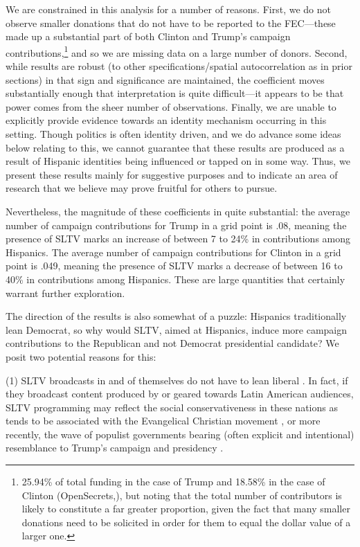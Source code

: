 \documentclass[11pt]{article}
\begin{document}
We are constrained in this analysis for a number of reasons. First, we do not observe smaller donations that do not have to be reported to the FEC---these made up a substantial part of both Clinton and Trump's campaign contributions,\footnote{ 25.94\% of total funding in the case of Trump and 18.58\% in the case of Clinton (OpenSecrets,\cite{noauthor_2016_2017}), but noting that the total number of contributors is likely to constitute a far greater proportion, given the fact that many smaller donations need to be solicited in order for them to equal the dollar value of a larger one.} and so we are missing data on a large number of donors. Second, while results are robust (to other specifications/spatial autocorrelation as in prior sections) in that sign and significance are maintained, the coefficient moves substantially enough that interpretation is quite difficult---it appears to be that power comes from the sheer number of observations. Finally, we are unable to explicitly provide evidence towards an identity mechanism occurring in this setting. Though politics is often identity driven, and we do advance some ideas below relating to this, we cannot guarantee that these results are produced as a result of Hispanic identities being influenced or tapped on in some way. Thus, we present these results mainly for suggestive purposes and to indicate an area of research that we believe may prove fruitful for others to pursue. 

Nevertheless, the magnitude of these coefficients in quite substantial: the average number of campaign contributions for Trump in a grid point is .08, meaning the presence of SLTV marks an increase of between 7 to 24\% in contributions among Hispanics. The average number of campaign contributions for Clinton in a grid point is .049, meaning the presence of SLTV marks a decrease of between 16 to 40\% in contributions among Hispanics. These are large quantities that certainly warrant further exploration.

The direction of the results is also somewhat of a puzzle: Hispanics traditionally lean Democrat, so why would SLTV, aimed at Hispanics, induce more campaign contributions to the Republican and not Democrat presidential candidate? We posit two potential reasons for this: 

(1) SLTV broadcasts in and of themselves do not have to lean liberal \citep{vega_mundofox_2012}. In fact, if they broadcast content produced by or geared towards Latin American audiences, SLTV programming may reflect the social conservativeness in these nations as tends to be associated with the Evangelical Christian movement \citep{lissardy_fuerza_2018}, or more recently, the wave of populist governments bearing (often explicit and intentional) resemblance to Trump's campaign and presidency \citep{ospina-valencia_is_2018}. 
\end{document}
